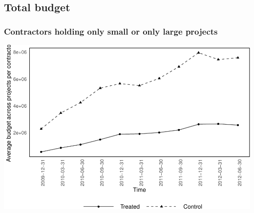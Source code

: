\documentclass[
]{article}
\begin{document}
\hypertarget{total-budget}{%
\subsection{Total budget}\label{total-budget}}

\hypertarget{contractors-holding-only-small-or-only-large-projects-1}{%
\subsubsection{Contractors holding only small or only large
projects}\label{contractors-holding-only-small-or-only-large-projects-1}}

\includegraphics{qp_first_pc_delay_clean_control_time_independent_files/figure-latex/budget_0-1.pdf}
\end{document}
